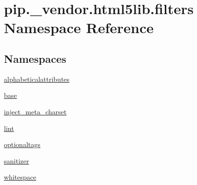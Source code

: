 \hypertarget{namespacepip_1_1__vendor_1_1html5lib_1_1filters}{}\section{pip.\+\_\+vendor.\+html5lib.\+filters Namespace Reference}
\label{namespacepip_1_1__vendor_1_1html5lib_1_1filters}
\subsection*{Namespaces}
\begin{DoxyCompactItemize}
\item 
 \hyperlink{namespacepip_1_1__vendor_1_1html5lib_1_1filters_1_1alphabeticalattributes}{alphabeticalattributes}
\item 
 \hyperlink{namespacepip_1_1__vendor_1_1html5lib_1_1filters_1_1base}{base}
\item 
 \hyperlink{namespacepip_1_1__vendor_1_1html5lib_1_1filters_1_1inject__meta__charset}{inject\+\_\+meta\+\_\+charset}
\item 
 \hyperlink{namespacepip_1_1__vendor_1_1html5lib_1_1filters_1_1lint}{lint}
\item 
 \hyperlink{namespacepip_1_1__vendor_1_1html5lib_1_1filters_1_1optionaltags}{optionaltags}
\item 
 \hyperlink{namespacepip_1_1__vendor_1_1html5lib_1_1filters_1_1sanitizer}{sanitizer}
\item 
 \hyperlink{namespacepip_1_1__vendor_1_1html5lib_1_1filters_1_1whitespace}{whitespace}
\end{DoxyCompactItemize}
